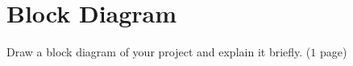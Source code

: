 
\chapter{Block Diagram}
\label{Chapter7}

Draw a block diagram of your project and explain it briefly. ($1$ page)